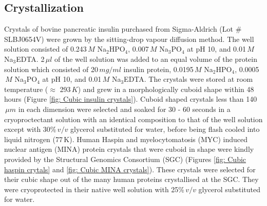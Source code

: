 \subsection{Crystallization}
\label{sub:Crystallisation}
Crystals of bovine pancreatic insulin purchased from Sigma-Aldrich (Lot \# SLBJ0654V) were grown by the sitting-drop vapour diffusion method.
The well solution consisted of 0.243$\, M$ Na$_{\text{2}}$HPO$_{\text{4}}$, 0.007$\, M$ Na$_{\text{3}}$PO$_{\text{4}}$ at pH 10, and 0.01$\,M$ Na$_{\text{3}}$EDTA.
2$\, \mu l$ of the well solution was added to an equal volume of the protein solution which consisted of 20$\, mg/ml$ insulin protein, 0.0195$\, M$ Na$_{\text{2}}$HPO$_{\text{4}}$, 0.0005$\, M$ Na$_{\text{3}}$PO$_{\text{4}}$ at pH 10, and 0.01$\, M$ Na$_\text{3}$EDTA.
The crystals were stored at room temperature ($\approx$ 293$\,K$) and grew in a morphologically cuboid shape within 48 hours (Figure \ref{fig: Cubic insulin crystals}).
Cuboid shaped crystals less than 140$\, \mu m$ in each dimension were selected and soaked for 30 - 60 seconds in a cryoproctectant solution with an identical composition to that of the well solution except with 30\%$\, v/v$ glycerol substituted for water, before being flash cooled into liquid nitrogen (77$\,$K).
\newline
Human Haspin and myelocytomatosis (MYC) induced nuclear antigen (MINA) protein crystals that were cuboid in shape were kindly provided by the Structural Genomics Consortium (SGC) (Figures \ref{fig: Cubic haspin crytals} and \ref{fig: Cubic MINA crystals}).
These crystals were selected for their cubic shape out of the many human proteins crystallised at the SGC.
They were cryoprotected in their native well solution with 25\%$\, v/v$ glycerol substituted for water.

